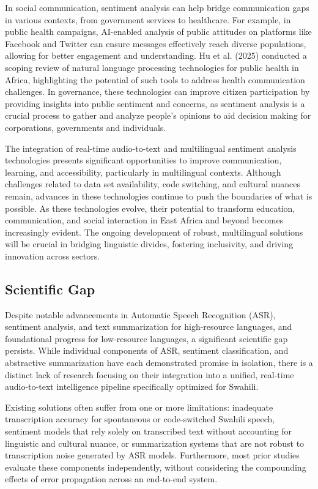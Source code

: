 \noindent In social communication, sentiment analysis can help bridge communication gaps in various contexts, from government services to healthcare. For example, in public health campaigns, AI-enabled analysis of public attitudes on platforms like Facebook and Twitter can ensure messages effectively reach diverse populations, allowing for better engagement and understanding. Hu et al. (2025) conducted a scoping review of natural language processing technologies for public health in Africa, highlighting the potential of such tools to address health communication challenges. In governance, these technologies can improve citizen participation by providing insights into public sentiment and concerns, as sentiment analysis is a crucial process to gather and analyze people's opinions to aid decision making for corporations, governments and individuals.

\noindent The integration of real-time audio-to-text and multilingual sentiment analysis technologies presents significant opportunities to improve communication, learning, and accessibility, particularly in multilingual contexts. Although challenges related to data set availability, code switching, and cultural nuances remain, advances in these technologies continue to push the boundaries of what is possible. As these technologies evolve, their potential to transform education, communication, and social interaction in East Africa and beyond becomes increasingly evident. The ongoing development of robust, multilingual solutions will be crucial in bridging linguistic divides, fostering inclusivity, and driving innovation across sectors.

\subsection{Scientific Gap}

Despite notable advancements in Automatic Speech Recognition (ASR), sentiment analysis, and text summarization for high-resource languages, and foundational progress for low-resource languages, a significant scientific gap persists. While individual components of ASR, sentiment classification, and abstractive summarization have each demonstrated promise in isolation, there is a distinct lack of research focusing on their integration into a unified, real-time audio-to-text intelligence pipeline specifically optimized for Swahili.

Existing solutions often suffer from one or more limitations: inadequate transcription accuracy for spontaneous or code-switched Swahili speech, sentiment models that rely solely on transcribed text without accounting for linguistic and cultural nuance, or summarization systems that are not robust to transcription noise generated by ASR models. Furthermore, most prior studies evaluate these components independently, without considering the compounding effects of error propagation across an end-to-end system.

